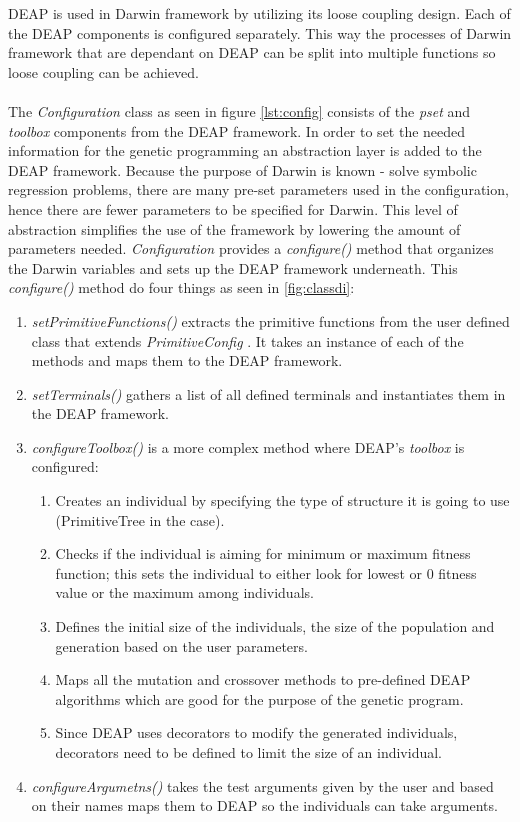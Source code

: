 DEAP is used in Darwin framework by utilizing its loose coupling design. Each of the DEAP components is configured
separately. This way the processes of Darwin framework that are dependant on DEAP can be split into multiple functions so loose coupling can
be achieved.
\paragraph{}
The \textit{Configuration} class as seen in figure \ref{lst:config} consists of the \textit{pset} and \textit{toolbox} components
from the DEAP framework. In order to set the needed information for the genetic programming an abstraction layer is added to the DEAP framework.
Because the purpose of Darwin is known - solve symbolic regression problems, there are many pre-set parameters used in the configuration, hence there are 
fewer parameters to be specified for Darwin. This level of abstraction simplifies the use of the
framework by lowering the amount of parameters needed. \textit{Configuration} provides a \textit{configure()} method
that organizes the Darwin variables and sets up the DEAP framework underneath. This \textit{configure()} method do four things as seen in \ref{fig:classdi}:

\begin{enumerate}
  \item \textit{setPrimitiveFunctions()} extracts the primitive functions from the user defined class that extends \textit{PrimitiveConfig} . It takes an instance
of each of the methods and maps them to the DEAP framework.
  \item \textit{setTerminals()} gathers a list of all defined terminals and instantiates them in the DEAP framework.
  \item \textit{configureToolbox()} is a more complex method where DEAP's \textit{toolbox} is configured:
  \begin{enumerate}
	\item Creates an individual by specifying the type of structure it is going to use (PrimitiveTree in the case). 
	\item Checks if the individual is aiming for minimum or maximum fitness function; this sets the individual to either look for lowest or 0 fitness value or the maximum among individuals.
	\item Defines the initial size of the individuals, the size of the population and generation based on the user parameters.
	\item Maps all the mutation and crossover methods to pre-defined DEAP algorithms which are good for the purpose of the genetic program.
	\item Since DEAP uses decorators to modify the generated individuals, decorators need to be defined to limit the size of an individual.
  \end{enumerate}
  \item \textit{configureArgumetns()} takes the test arguments given by the user and based on their names maps them to DEAP so the individuals can take arguments.
\end{enumerate}

